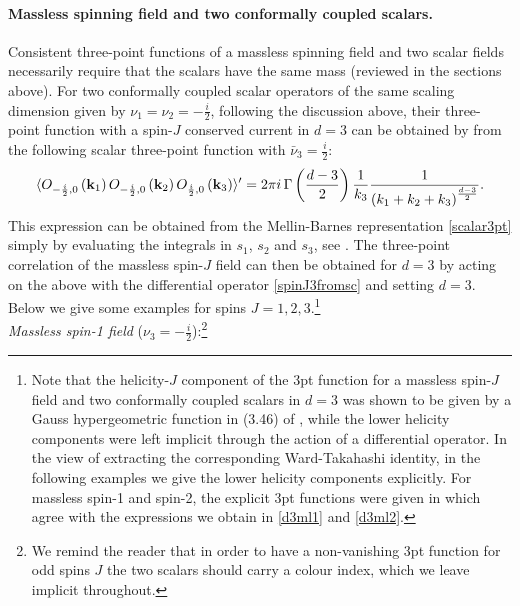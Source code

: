 \documentclass[11pt,a4paper]{article}
\begin{document}
\paragraph{Massless spinning field and two conformally coupled scalars.}

 Consistent three-point functions of a massless spinning field and two scalar fields necessarily require that the scalars have the same mass (reviewed in the sections above). For two conformally coupled scalar operators of the same scaling dimension given by $\nu_1 = \nu_2 = -\tfrac{i}{2}$, following the discussion above, their three-point function with a spin-$J$ conserved current in $d=3$ can be obtained by from the following scalar three-point function with ${\bar \nu}_3=\frac{i}{2}$:
\begin{equation}\label{3ptcc}
    \langle O_{-\frac{i}{2},0}\left({\bf k}_1\right)O_{-\frac{i}{2},0}\left({\bf k}_2\right)O_{\frac{i}{2},0}\left({\bf k}_3\right)  \rangle^\prime = 2\pi i\, \Gamma\left(\frac{d-3}{2}\right)\frac{1}{ k_3}\frac{1}{\left(k_1+k_2+k_3\right)^{\frac{d-3}{2}}}.
\end{equation}
This expression can be obtained from the Mellin-Barnes representation \eqref{scalar3pt} simply by evaluating the integrals in $s_1$, $s_2$ and $s_3$, see \cite{Sleight:2019mgd,Sleight:2019hfp}. The three-point correlation of the massless spin-$J$ field can then be obtained for $d=3$ by acting on the above with the differential operator \eqref{spinJ3fromsc} and setting $d=3$. Below we give some examples for spins $J=1,2,3$.\footnote{Note that the helicity-$J$ component of the 3pt function for a massless spin-$J$ field and two conformally coupled scalars in $d=3$ was shown to be given by a Gauss hypergeometric function in (3.46) of \cite{Sleight:2019hfp}, while the lower helicity components were left implicit through the action of a differential operator. In the view of extracting the corresponding Ward-Takahashi identity, in the following examples we give the lower helicity components explicitly. For massless spin-1 and spin-2, the explicit 3pt functions were given in \cite{Bzowski:2013sza,Baumann:2020dch} which agree with the expressions we obtain in \eqref{d3ml1} and \eqref{d3ml2}.}\\

\newpage
\emph{Massless spin-1 field} ($\nu_3=-\frac{i}{2}$):\footnote{We remind the reader that in order to have a non-vanishing 3pt function for odd spins $J$ the two scalars should carry a colour index, which we leave implicit throughout.}
\end{document}
